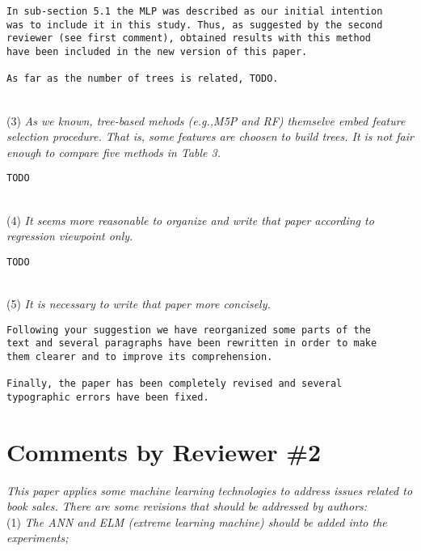 \documentclass[preprint]{elsarticle}
\begin{document}
\begin{verbatim}
In sub-section 5.1 the MLP was described as our initial intention 
was to include it in this study. Thus, as suggested by the second 
reviewer (see first comment), obtained results with this method 
have been included in the new version of this paper.

As far as the number of trees is related, TODO.
\end{verbatim}

~\\
\noindent (3) \emph{As we known, tree-based mehods (e.g.,M5P and RF) themselve embed feature selection procedure. That is, some features are choosen to build trees. It is not fair enough to compare five methods in Table 3. } 

\begin{verbatim}
TODO
\end{verbatim}

~\\
\noindent (4) \emph{It seems more reasonable to organize and write that paper according to regression viewpoint only. } 

\begin{verbatim}
TODO
\end{verbatim}

~\\
\noindent (5) \emph{It is necessary to write that paper more concisely. } 

\begin{verbatim}
Following your suggestion we have reorganized some parts of the 
text and several paragraphs have been rewritten in order to make 
them clearer and to improve its comprehension.

Finally, the paper has been completely revised and several 
typographic errors have been fixed.
\end{verbatim}



\section{Comments by Reviewer \#2}

\noindent \emph{This paper applies some machine learning technologies to address issues related to book sales. There are some revisions that should be addressed by authors: } \\


\noindent (1) \emph{The ANN and ELM (extreme learning machine) should be added into the experiments; } 
\end{document}
